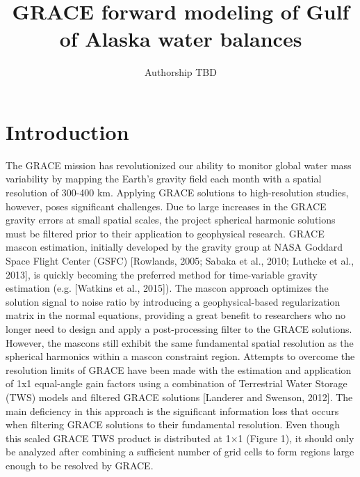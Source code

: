 \documentclass[review]{igs}
\begin{document}
\title[GRACE Forward Modeling]{GRACE forward modeling of Gulf of Alaska water balances}

\author[Arendt and others]{Authorship TBD}



\maketitle

\section{Introduction}



\citep{beamer_high-resolution_2016}

The GRACE mission has revolutionized our ability to monitor global water mass variability by mapping the Earth’s gravity field each month with a spatial resolution of 300-400 km. Applying GRACE solutions to high-resolution studies, however, poses significant challenges. Due to large increases in the GRACE gravity errors at small spatial scales, the project spherical harmonic solutions must be filtered prior to their application to geophysical research. GRACE mascon estimation, initially developed by the gravity group at NASA Goddard Space Flight Center (GSFC) [Rowlands, 2005; Sabaka et al., 2010; Luthcke et al., 2013], is quickly becoming the preferred method for time-variable gravity estimation (e.g. [Watkins et al., 2015]). The mascon approach optimizes the solution signal to noise ratio by introducing a geophysical-based regularization matrix in the normal equations, providing a great benefit to researchers who no longer need to design and apply a post-processing filter to the GRACE solutions. However, the mascons still exhibit the same fundamental spatial resolution as the spherical harmonics within a mascon constraint region. Attempts to overcome the resolution limits of GRACE have been made with the estimation and application of 1x1 equal-angle gain factors using a combination of Terrestrial Water Storage (TWS) models and filtered GRACE solutions [Landerer and Swenson, 2012]. The main deficiency in this approach is the significant information loss that occurs when filtering GRACE solutions to their fundamental resolution. Even though this scaled GRACE TWS product is distributed at 1×1 (Figure 1), it should only be analyzed after combining a sufficient number of grid cells to form regions large enough to be resolved by GRACE.
\end{document}
